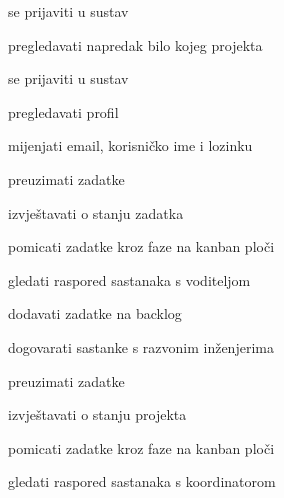 			
			\begin{packed_enum}
				\item  {}
				
				\begin{packed_enum}
					
					\item se prijaviti u sustav
					\item pregledavati napredak bilo kojeg projekta
					
				\end{packed_enum}
			
				\item  {}
				
				\begin{packed_enum}
					
					\item se prijaviti u sustav
					\item pregledavati profil
					\item mijenjati email, korisničko ime i lozinku
					
				\end{packed_enum}
			
				\item  {}
			
				\begin{packed_enum}
					
					\item preuzimati zadatke
					\item izvještavati o stanju zadatka
					\item pomicati zadatke kroz faze na kanban ploči
					\item gledati raspored sastanaka s voditeljom
					
				\end{packed_enum}
			
				\item  {}
			
				\begin{packed_enum}
					
					\item dodavati zadatke na backlog
					\item dogovarati sastanke s razvonim inženjerima
					\item preuzimati zadatke
					\item izvještavati o stanju projekta
					\item pomicati zadatke kroz faze na kanban ploči
					\item gledati raspored sastanaka s koordinatorom
					

\end{packed_enum}
\end{packed_enum}
